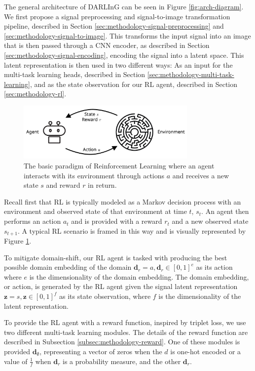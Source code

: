 The general architecture of DARLInG can be seen in Figure \ref{fig:arch-diagram}.
We first propose a signal preprocessing and signal-to-image transformation pipeline, described in Section \ref{sec:methodology-signal-preprocessing} and \ref{sec:methodology-signal-to-image}.
This transforms the input signal into an image that is then passed through a CNN encoder, as described in Section \ref{sec:methodology-signal-encoding}, encoding the signal into a latent space.
This latent representation is then used in two different ways: As an input for the multi-task learning heads, described in Section \ref{sec:methodology-multi-task-learning}, and as the state observation for our RL agent, described in Section \ref{sec:methodology-rl}.

\begin{figure}
	\centering
	\includegraphics[width=0.78\textwidth]{figures/rl_paradigm}
	\caption{The basic paradigm of Reinforcement Learning where an agent interacts with its environment through actions $a$ and receives a new state $s$ and reward $r$ in return.}\label{fig:rl-paradigm}
\end{figure}
Recall first that RL is typically modeled as a Markov decision process with an environment and observed state of that environment at time $t$, $s_t$. An agent then performs an action $a_t$ and is provided with a reward $r_t$ and a new observed state $s_{t+1}$.
A typical RL scenario is framed in this way and is visually represented by Figure \ref{fig:rl-paradigm}.

To mitigate domain-shift, our RL agent is tasked with producing the best possible domain embedding of the domain $\boldsymbol{d}_r = a, \boldsymbol{d}_r \in [0, 1]^e$ as its action where $e$ is the dimensionality of the domain embedding.
The domain embedding, or action, is generated by the RL agent given the signal latent representation $\boldsymbol{z} = s, \boldsymbol{z} \in [0, 1]^f$ as its state observation, where $f$ is the dimensionality of the latent representation.

To provide the RL agent with a reward function, inspired by triplet loss, we use two different multi-task learning modules.
The details of the reward function are described in Subsection \ref{subsec:methodology-reward}.
One of these modules is provided $\boldsymbol{d}_{\emptyset}$, representing a vector of zeros when the $d$ is one-hot encoded or a value of $\frac{1}{f}$ when $\boldsymbol{d}_r$ is a probability measure, and the other $\boldsymbol{d}_{r}$.

